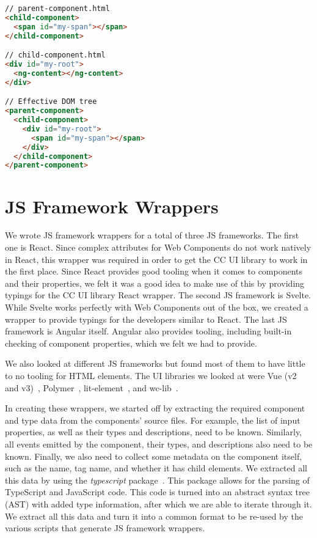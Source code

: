 \begin{lstlisting}[language={HTML},caption={HTML source code and its Angular Elements equivalent},label={lst:case-study:ng-content}]
// parent-component.html
<child-component>
  <span id="my-span"></span>
</child-component>

// child-component.html
<div id="my-root">
  <ng-content></ng-content>
</div>

// Effective DOM tree
<parent-component>
  <child-component>
    <div id="my-root">
      <span id="my-span"></span>
    </div>
  </child-component>
</parent-component>
  \end{lstlisting}

\section{JS Framework Wrappers}
We wrote JS framework wrappers for a total of three JS frameworks. The first one is React. Since complex attributes for Web Components do not work natively in React, this wrapper was required in order to get the CC UI library to work in the first place. Since React provides good tooling when it comes to components and their properties, we felt it was a good idea to make use of this by providing typings for the CC UI library React wrapper. The second JS framework is Svelte. While Svelte works perfectly with Web Components out of the box, we created a wrapper to provide typings for the developers similar to React. The last JS framework is Angular itself. Angular also provides tooling, including built-in checking of component properties, which we felt we had to provide.

We also looked at different JS frameworks but found most of them to have little to no tooling for HTML elements. The UI libraries we looked at were Vue (v2 and v3)~, Polymer~, lit-element~, and wc-lib~.

In creating these wrappers, we started off by extracting the required component and type data from the components' source files. For example, the list of input properties, as well as their types and descriptions, need to be known. Similarly, all events emitted by the component, their types, and descriptions also need to be known. Finally, we also need to collect some metadata on the component itself, such as the name, tag name, and whether it has child elements. We extracted all this data by using the \emph{typescript} package~. This package allows for the parsing of TypeScript and JavaScript code. This code is turned into an abstract syntax tree (AST) with added type information, after which we are able to iterate through it. We extract all this data and turn it into a common format to be re-used by the various scripts that generate JS framework wrappers.

